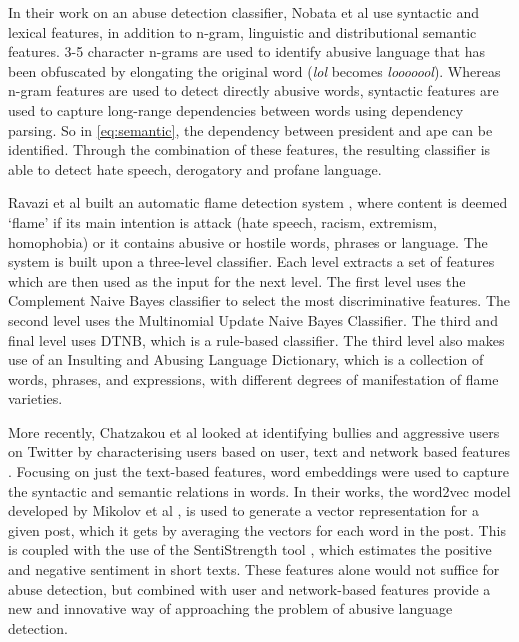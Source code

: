 In their work on an abuse detection classifier, Nobata et al \cite{nobata2016abusive} use syntactic and lexical features, in addition to n-gram, linguistic and distributional semantic features. 3-5 character n-grams are used to identify abusive language that has been obfuscated by elongating the original word (\textsl{lol} becomes \textsl{looooool}). Whereas n-gram features are used to detect directly abusive words, syntactic features are used to capture long-range dependencies between words using dependency parsing. So in \ref{eq:semantic}, the dependency between president and ape can be identified. Through the combination of these features, the resulting classifier is able to detect hate speech, derogatory and profane language.

Ravazi et al built an automatic flame detection system \cite{razavi2010offensive}, where content is deemed `flame' if its main intention is attack (hate speech, racism, extremism, homophobia) or it contains abusive or hostile words, phrases or language. The system is built upon a three-level classifier. Each level extracts a set of features which are then used as the input for the next level. The first level uses the Complement Naive Bayes classifier to select the most discriminative features. The second level uses the Multinomial Update Naive Bayes Classifier. The third and final level uses DTNB, which is a rule-based classifier. The third level also makes use of an Insulting and Abusing Language Dictionary, which is a collection of words, phrases, and expressions, with different degrees of manifestation of flame varieties.

More recently, Chatzakou et al looked at identifying bullies and aggressive users on Twitter by characterising users based on user, text and network based features \cite{chatzakou2017mean}. Focusing on just the text-based features, word embeddings were used to capture the syntactic and semantic relations in words. In their works, the word2vec model developed by Mikolov et al \cite{mikolov2013efficient}, is used to generate a vector representation for a given post, which it gets by averaging the vectors for each word in the post. This is coupled with the use of the SentiStrength tool \cite{SentiStrength:Home}, which estimates the positive and negative sentiment in short texts. These features alone would not suffice for abuse detection, but combined with user and network-based features provide a new and innovative way of approaching the problem of abusive language detection.

